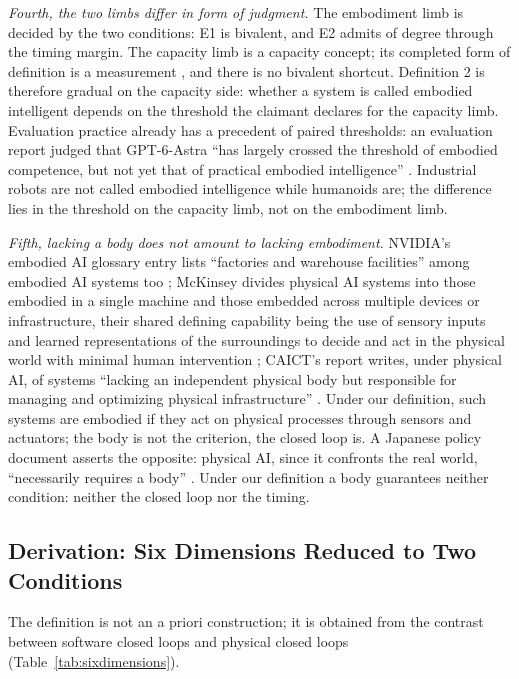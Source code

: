 \documentclass[10pt]{article}
\begin{document}
\textit{Fourth, the two limbs differ in form of judgment.} The embodiment limb is decided by the two conditions: E1 is bivalent, and E2 admits of degree through the timing margin. The capacity limb is a capacity concept; its completed form of definition is a measurement \cite{yu2026four}, and there is no bivalent shortcut. Definition 2 is therefore gradual on the capacity side: whether a system is called embodied intelligent depends on the threshold the claimant declares for the capacity limb. Evaluation practice already has a precedent of paired thresholds: an evaluation report judged that GPT-6-Astra ``has largely crossed the threshold of embodied competence, but not yet that of practical embodied intelligence'' \cite{gptastra2026}. Industrial robots are not called embodied intelligence while humanoids are; the difference lies in the threshold on the capacity limb, not on the embodiment limb.

\textit{Fifth, lacking a body does not amount to lacking embodiment.} NVIDIA's embodied AI glossary entry lists ``factories and warehouse facilities'' among embodied AI systems too \cite{nvglossary}; McKinsey divides physical AI systems into those embodied in a single machine and those embedded across multiple devices or infrastructure, their shared defining capability being the use of sensory inputs and learned representations of the surroundings to decide and act in the physical world with minimal human intervention \cite{mckinsey2026}; CAICT's report writes, under physical AI, of systems ``lacking an independent physical body but responsible for managing and optimizing physical infrastructure'' \cite{caict2026}. Under our definition, such systems are embodied if they act on physical processes through sensors and actuators; the body is not the criterion, the closed loop is. A Japanese policy document asserts the opposite: physical AI, since it confronts the real world, ``necessarily requires a body'' \cite{japanrobo2026}. Under our definition a body guarantees neither condition: neither the closed loop nor the timing.

\subsection{Derivation: Six Dimensions Reduced to Two Conditions}\label{sec:derivation}

The definition is not an a priori construction; it is obtained from the contrast between software closed loops and physical closed loops (Table~\ref{tab:sixdimensions}).
\end{document}
